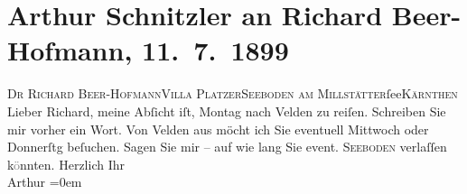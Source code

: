 

         
         \renewcommand{\erwaehntePersonen}{Personen: Richard Beer-Hofmann}
         \renewcommand{\erwaehnteOrte}{Orte: I., Innere Stadt, Kärnten, Seeboden, Velden am Wörthersee, Villa Platzer, Wien}
         \renewcommand{\erwaehnteWerke}{}
               \section[Arthur Schnitzler an Richard Beer-Hofmann, 11. 7. 1899]{ Arthur Schnitzler an Richard Beer-Hofmann, 11. 7. 1899}\nopagebreak{}\rehead{ }\begin{ledgroupsized}[t]{13cm}\normalsize\beginnumbering \toendnotes[C]{\smallbreak\pagebreak[2]} 
\pstart{}{\pb}\textsc{Dr Richard
                     Beer-Hofmann}\pend{}\pstart{}\textsc{Villa Platzer}\pend{}\pstart{}\textsc{Seeboden am Millstätter}ſee\pend{}\pstart{}\textsc{Kärnthen}\pend{}{\bigskip}\pstart
           \noindent{}{\pb}Lieber Richard, meine Abſicht
               iſt, Montag nach Velden zu reiſen.
               Schreiben Sie mir vorher ein Wort. Von Velden aus
               möcht ich Sie eventuell Mittwoch oder Donnerſtg beſuchen.
               Sagen Sie mir – auf wie lang Sie {\pb}event.
                  \textsc{Seeboden} verlaſſen
               k\textcolor{gray}{ö}nnten.\pend
           \pstart
           Herzlich Ihr{\\[\baselineskip]}\spacefill\mbox{Arthur}\pend
           \leftskip=0em{}
         
         \endnumbering{}\end{ledgroupsized}  \newcommand{\dateiname}{L00937}\newcommand{\titel}{Arthur Schnitzler an Richard Beer-Hofmann, 11. 7. 1899}\newcommand{\editorInnen}{Martin Anton Müller und Gerd-Hermann Susen}
      